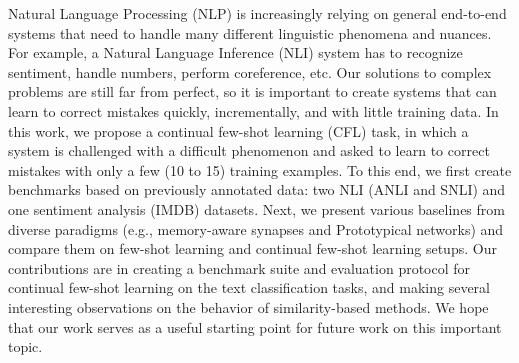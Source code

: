 Natural Language Processing (NLP) is increasingly relying on general end-to-end systems that need to handle many different linguistic phenomena and nuances. For example, a Natural Language Inference (NLI) system has to recognize sentiment, handle numbers, perform coreference, etc. Our solutions to complex problems are still far from perfect, so it is important to create systems that can learn to correct mistakes quickly, incrementally, and with little training data. In this work, we propose a continual few-shot learning (CFL) task, in which a system is challenged with a difficult phenomenon and asked to learn to correct mistakes with only a few (10 to 15) training examples. To this end, we first create benchmarks based on previously annotated data: two NLI (ANLI and SNLI) and one sentiment analysis (IMDB) datasets. Next, we present various baselines from diverse paradigms (e.g., memory-aware synapses and Prototypical networks) and compare them on few-shot learning and continual few-shot learning setups. Our contributions are in creating a benchmark suite and evaluation protocol for continual few-shot learning on the text classification tasks, and making several interesting observations on the behavior of similarity-based methods. We hope that our work serves as a useful starting point for future work on this important topic.
